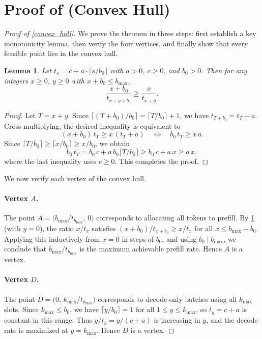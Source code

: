 \documentclass[11pt]{article}
\theoremstyle{plain}
\newtheorem{lemma}[theorem]{Lemma}
\theoremstyle{definition}
\theoremstyle{remark}
\begin{document}
\section{Proof of  (Convex Hull)}
\label{sec:proof-convex-hull}

\begin{proof}[Proof of \cref{convex_hull}]
We prove the theorem in three steps: first establish a key monotonicity lemma, then verify the four vertices, and finally show that every feasible point lies in the convex hull.

\begin{lemma} \label{lem:monotonicity}
Let \( t_s = c + a \cdot \lceil s/b_0 \rceil \) with \( a > 0 \), \( c \ge 0 \), and \( b_0 > 0 \). Then for any integers \( x \ge 0 \), \( y \ge 0 \) with \( x + b_0 \le b_{\max} \),
\[
\frac{x + b_0}{t_{x + y + b_0}} \ge \frac{x}{t_{x + y}}.
\]
\end{lemma}

\begin{proof}
Let \( T = x + y \). Since \( \lceil (T + b_0)/b_0 \rceil = \lceil T/b_0 \rceil + 1 \), we have \( t_{T + b_0} = t_T + a \). Cross-multiplying, the desired inequality is equivalent to
\[
(x + b_0)\, t_T \ge x\, (t_T + a) \quad \Longleftrightarrow \quad b_0\, t_T \ge x\, a.
\]
Since \( \lceil T/b_0 \rceil \ge \lceil x/b_0 \rceil \ge x/b_0 \), we obtain
\[
b_0\, t_T = b_0\, c + a\, b_0 \lceil T/b_0 \rceil \ge b_0\, c + a\, x \ge a\, x,
\]
where the last inequality uses \( c \ge 0 \). This completes the proof.
\end{proof}

We now verify each vertex of the convex hull.

\paragraph{Vertex $A$.} The point \( A = \bigl( b_{\max}/t_{b_{\max}},\, 0 \bigr) \) corresponds to allocating all tokens to prefill. By \cref{lem:monotonicity} (with \( y = 0 \)), the ratio \( x/t_x \) satisfies \( (x + b_0)/t_{x+b_0} \ge x/t_x \) for all \( x \le b_{\max} - b_0 \). Applying this inductively from \( x = 0 \) in steps of \( b_0 \), and using \( b_0 \mid b_{\max} \), we conclude that \( b_{\max}/t_{b_{\max}} \) is the maximum achievable prefill rate. Hence \( A \) is a vertex.

\paragraph{Vertex $D$.} The point \( D = \bigl( 0,\, k_{\max}/t_{k_{\max}} \bigr) \) corresponds to decode-only batches using all \( k_{\max} \) slots. Since \( k_{\max} \le b_0 \), we have \( \lceil y/b_0 \rceil = 1 \) for all \( 1 \le y \le k_{\max} \), so \( t_y = c + a \) is constant in this range. Thus \( y/t_y = y/(c + a) \) is increasing in \( y \), and the decode rate is maximized at \( y = k_{\max} \). Hence \( D \) is a vertex.


\end{proof}
\end{document}
